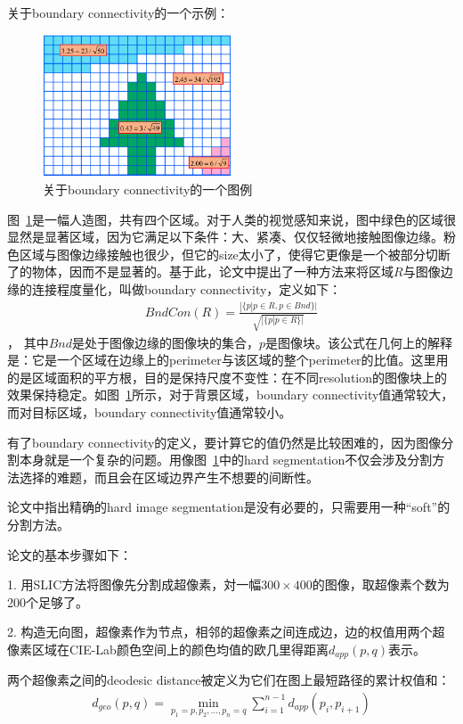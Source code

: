 \documentclass[12pt]{article}
\begin{document}
关于boundary connectivity的一个示例：
\begin{figure}[!ht]
\centering
\includegraphics[width=0.5\textwidth]{wCtr.png}
\caption{关于boundary connectivity的一个图例}
\label{fig: wCtr}
\end{figure}

图~\ref{fig: wCtr}是一幅人造图，共有四个区域。对于人类的视觉感知来说，图中绿色的区域很显然是显著区域，因为它满足以下条件：大、紧凑、仅仅轻微地接触图像边缘。粉色区域与图像边缘接触也很少，但它的size太小了，使得它更像是一个被部分切断了的物体，因而不是显著的。基于此，论文中提出了一种方法来将区域$R$与图像边缘的连接程度量化，叫做boundary connectivity，定义如下：
\begin{align}
BndCon(R) = \frac{|\{p|p \in R, p \in Bnd\}|}{\sqrt{|\{p|p \in R\}|}}
\end{align}，
其中$Bnd$是处于图像边缘的图像块的集合，$p$是图像块。该公式在几何上的解释是：它是一个区域在边缘上的perimeter与该区域的整个perimeter的比值。这里用的是区域面积的平方根，目的是保持尺度不变性：在不同resolution的图像块上的效果保持稳定。如图~\ref{fig: wCtr}所示，对于背景区域，boundary connectivity值通常较大，而对目标区域，boundary connectivity值通常较小。

有了boundary connectivity的定义，要计算它的值仍然是比较困难的，因为图像分割本身就是一个复杂的问题。用像图~\ref{fig: wCtr}中的hard segmentation不仅会涉及分割方法选择的难题，而且会在区域边界产生不想要的间断性。

论文中指出精确的hard image segmentation是没有必要的，只需要用一种“soft”的分割方法。

论文的基本步骤如下：

1. 用SLIC方法将图像先分割成超像素，対一幅$300 \times 400$的图像，取超像素个数为200个足够了。

2. 构造无向图，超像素作为节点，相邻的超像素之间连成边，边的权值用两个超像素区域在CIE-Lab颜色空间上的颜色均值的欧几里得距离$d_{app}(p, q)$表示。

两个超像素之间的deodesic distance被定义为它们在图上最短路径的累计权值和：
\begin{align}
d_{geo}(p, q) = \min_{p_1=p, p_2, \ldots, p_n=q}\sum_{i=1}^{n-1}d_{app}(p_i, p_{i+1})
\end{align}
\end{document}
